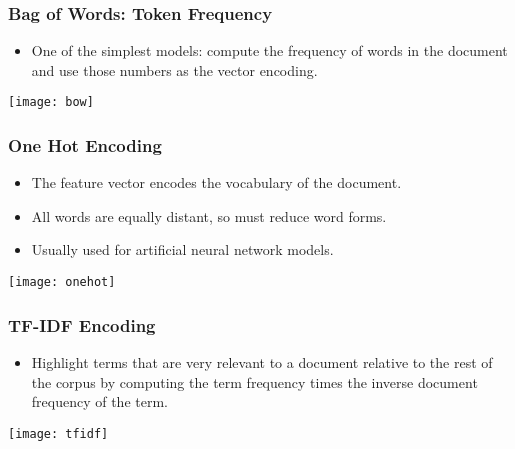 \begin{frame}[fragile]\frametitle{Bag of Words: Token Frequency}
\begin{itemize}
\item  One of the simplest models: compute the frequency of words in 
the document and use those numbers as the vector encoding.
\end{itemize}
\begin{center}
\texttt{[image: bow]}
\end{center}
\end{frame}

\begin{frame}[fragile]\frametitle{One Hot Encoding}
\begin{itemize}
\item   The feature vector encodes the vocabulary of the document. 
\item  All words are equally distant, so must reduce word forms. 
\item  Usually used for artificial neural network models.
\end{itemize}
\begin{center}
\texttt{[image: onehot]}
\end{center}
\end{frame}

\begin{frame}[fragile]\frametitle{TF-IDF Encoding}
\begin{itemize}
\item   Highlight terms that are very relevant to a document relative to 
the rest of the corpus by computing the term frequency times 
the inverse document frequency of the term. 
\end{itemize}
\begin{center}
\texttt{[image: tfidf]}
\end{center}
\end{frame}


